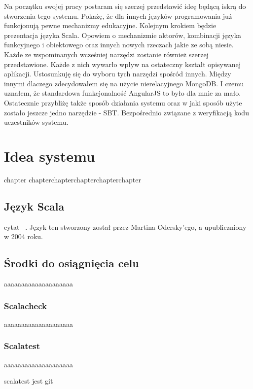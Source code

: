 \documentclass[brudnopis]{xmgr}
\begin{document}
\medskip Na początku swojej pracy postaram się szerzej przedstawić ideę będącą iskrą do stworzenia tego systemu. Pokażę, że dla innych języków programowania już funkcjonują pewne mechanizmy edukacyjne. Kolejnym krokiem będzie prezentacja języka Scala. Opowiem o mechanizmie aktorów, kombinacji języka funkcyjnego i obiektowego oraz innych nowych rzeczach jakie ze sobą niesie. Każde ze wspominanych wcześniej narzędzi zostanie również szerzej przedstawione. Każde z nich wywarło wpływ na ostateczny kształt opisywanej aplikacji. Ustosunkuję się do wyboru tych narzędzi spośród innych. Między innymi dlaczego zdecydowałem się na użycie nierelacyjnego MongoDB. I czemu uznałem, że standardowa funkcjonalność AngularJS to było dla mnie za mało. Ostatecznie przybliżę także sposób działania systemu oraz w jaki sposób użyte zostało jeszcze jedno narzędzie - SBT. Bezpośrednio związane z weryfikacją kodu uczestników systemu. 

\chapter{Idea systemu}

chapter chapterchapterchapterchapterchapter 

\section{Język Scala}

cytat ~\cite[s.~123]{Elmasri:2002:CMC}. 
Język ten stworzony został przez Martina Odersky'ego, a upubliczniony w 2004 roku.

    
\section{Środki do osiągnięcia celu}

aaaaaaaaaaaaaaaaaaaa

\subsection{Scalacheck}

aaaaaaaaaaaaaaaaaaaa

\subsection{Scalatest} 

aaaaaaaaaaaaaaaaaaaa

scalatest jest git
      
\end{document}
